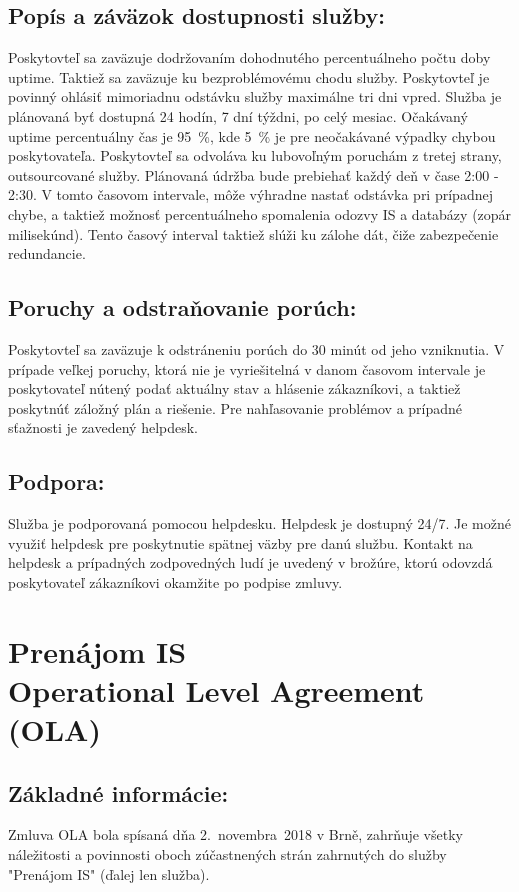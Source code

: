 \documentclass[a4paper, 11pt]{article}
\begin{document}
\begin{center}
\subsection*{Popís a záväzok dostupnosti služby:}
Poskytovteľ sa zaväzuje dodržovaním dohodnutého percentuálneho počtu doby uptime. Taktiež sa zaväzuje ku bezproblémovému chodu služby. Poskytovteľ je povinný ohlásiť mimoriadnu odstávku služby
maximálne tri dni vpred. Služba je plánovaná byť dostupná 24 hodín, 7 dní týždni, po celý mesiac. Očakávaný uptime percentuálny čas je 95~\%, kde 5~\% je pre neočakávané výpadky chybou poskytovateľa.
Poskytovteľ sa odvoláva ku lubovoľným poruchám z tretej strany, outsourcované služby. Plánovaná údržba bude prebiehať každý deň v čase 2:00 - 2:30. V tomto časovom intervale, môže výhradne nastať
odstávka pri prípadnej chybe, a taktiež možnosť percentuálneho spomalenia odozvy IS a databázy (zopár milisekúnd). Tento časový interval taktiež slúži ku zálohe dát, čiže zabezpečenie redundancie.

\subsection*{Poruchy a odstraňovanie porúch:}
Poskytovteľ sa zaväzuje k odstráneniu porúch do 30 minút od jeho vzniknutia. V prípade veľkej poruchy, ktorá nie je vyriešitelná v danom časovom intervale je poskytovateľ nútený podať aktuálny stav 
a hlásenie zákazníkovi, a taktiež poskytnúť záložný plán a riešenie. Pre nahľasovanie problémov a prípadné sťažnosti je zavedený helpdesk.

\subsection*{Podpora:}
Služba je podporovaná pomocou helpdesku. Helpdesk je dostupný 24/7. Je možné využiť helpdesk pre poskytnutie spätnej väzby pre danú službu. Kontakt na helpdesk a prípadných zodpovedných ludí
je uvedený v brožúre, ktorú odovzdá poskytovateľ zákazníkovi okamžite po podpise zmluvy.

\hfill
\section*{ \Large Prenájom IS \\ Operational Level Agreement (OLA)}
\hfill
\subsection*{Základné informácie:}
Zmluva OLA bola spísaná dňa 2.~novembra~2018 v Brně, zahrňuje všetky náležitosti a povinnosti oboch zúčastnených strán zahrnutých do služby "Prenájom IS" (ďalej len služba).


\end{center}
\end{document}
